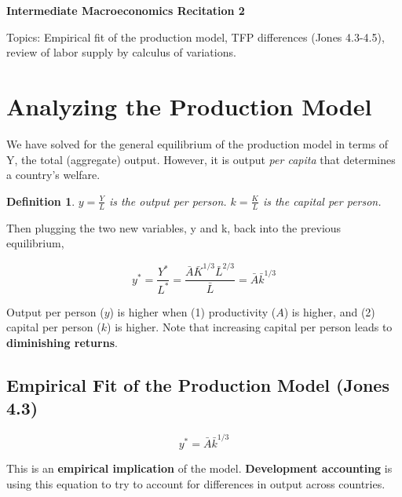 \documentclass[12pt]{article}
\newtheorem{mydef}{Definition}
\begin{document}
{\Large \bf Intermediate Macroeconomics Recitation 2}

Topics: Empirical fit of the production model, TFP differences (Jones 4.3-4.5), review of labor supply by calculus of variations.

 \section{Analyzing the Production Model}
 
 
 
We have solved for the general equilibrium of the production model in terms of Y, the total (aggregate) output. However, it is output \textit{per capita} that determines a country's welfare. 

\begin{mydef} $y = \frac{Y}{L}$ is the output per person. $k = \frac{K}{L}$ is the capital per person. \end{mydef}

Then plugging the two new variables, y and k, back into the previous equilibrium, 

\begin{equation*}
y^*=\frac{Y^*}{L^*}=\frac{{\bar{A}}{\bar{K}}^{1/3}{\bar{L}}^{2/3}}{\bar{L}}={\bar{A}\bar{k}^{1/3}}
\end{equation*}%

  
Output per person ($y$) is higher when (1) productivity ($A$) is higher, and (2) capital per person ($k$) is higher. Note that increasing capital per person leads to \textbf{diminishing returns}.

\subsection{Empirical Fit of the Production Model (Jones 4.3)}

\begin{equation*}
y^*={\bar{A}\bar{k}^{1/3}}
\end{equation*}%

This is an {\bf empirical implication} of the model.
{\bf Development accounting} is using this equation to try to account for differences in output across countries. 
\end{document}
